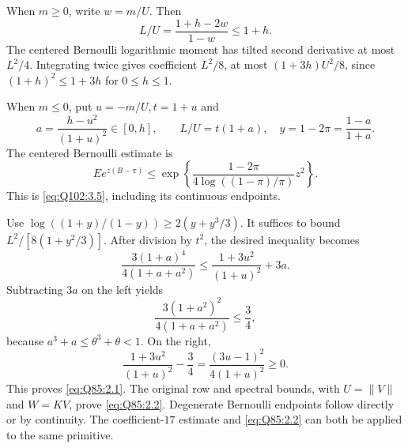 When \(m\ge\allowbreak 0\), write \(w=\allowbreak m/U\). Then
\[
 L/U=\frac{1+h-2w}{1-w}\le1+h.
\]
The centered Bernoulli logarithmic moment has tilted second derivative at most \(L^2/4\).
Integrating twice gives coefficient \(L^2/8\), at most
\((1+3h)U^2/8\), since \((1+h)^2\le\allowbreak 1+3h\) for \(0\le\allowbreak  h\le\allowbreak 1\).

When \(m\le\allowbreak 0\), put \(u=\allowbreak -m/U,\allowbreak t=\allowbreak 1+u\) and
\[
 a=\frac{h-u^2}{(1+u)^2}\in[0,h],\qquad
 L/U=t(1+a),\quad y=1-2\pi=\frac{1-a}{1+a}.          \tag{Q85.2.4}\label{eq:Q85:2.4}
\]
The centered Bernoulli estimate is
\[
 E e^{z(B-\pi)}\le
 \exp\left\{\frac{1-2\pi}{4\log((1-\pi)/\pi)}z^2\right\}.
                                                               \tag{Q85.2.5}\label{eq:Q85:2.5}
\]
This is \eqref{eq:Q102:3.5}, including its continuous endpoints.

Use \(\log((1+y)/(1-y))\ge\allowbreak 2(y+y^3/3)\).
It suffices to bound \(L^2/[8(1+y^2/3)]\).
After division by \(t^2\), the desired inequality becomes
\[
 \frac{3(1+a)^4}{4(1+a+a^2)}
 \le \frac{1+3u^2}{(1+u)^2}+3a.                     \tag{Q85.2.6}\label{eq:Q85:2.6}
\]
Subtracting \(3a\) on the left yields
\[
 \frac{3(1+a^2)^2}{4(1+a+a^2)}\le\frac34,
\]
because \(a^3+a\le\allowbreak \theta^3+\theta<\allowbreak 1\). On the right,
\[
 \frac{1+3u^2}{(1+u)^2}-\frac34
 =\frac{(3u-1)^2}{4(1+u)^2}\ge0.
\]
This proves \eqref{eq:Q85:2.1}.
The original row and spectral bounds, with \(U=\allowbreak \|V\|\) and \(W=\allowbreak KV\), prove \eqref{eq:Q85:2.2}.
Degenerate Bernoulli endpoints follow directly or by continuity.
The coefficient-\(17\) estimate and \eqref{eq:Q85:2.2} can both be applied to the same primitive.

